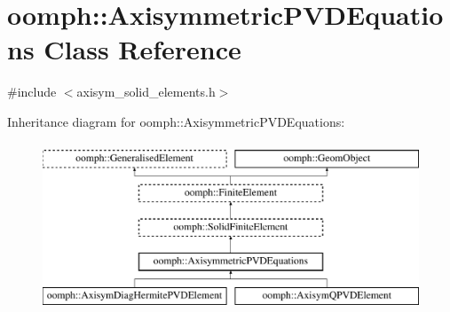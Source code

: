 \hypertarget{classoomph_1_1AxisymmetricPVDEquations}{}\section{oomph\+:\+:Axisymmetric\+P\+V\+D\+Equations Class Reference}
\label{classoomph_1_1AxisymmetricPVDEquations}


{\ttfamily \#include $<$axisym\+\_\+solid\+\_\+elements.\+h$>$}

Inheritance diagram for oomph\+:\+:Axisymmetric\+P\+V\+D\+Equations\+:\begin{figure}[H]
\begin{center}
\leavevmode
\includegraphics[height=5.000000cm]{classoomph_1_1AxisymmetricPVDEquations}
\end{center}
\end{figure}
